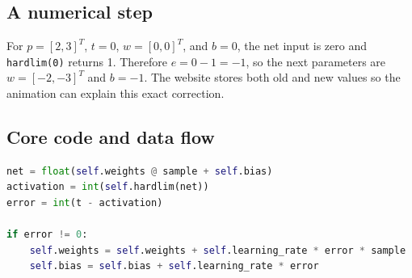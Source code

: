 \documentclass[12pt,a4paper,openany]{report}
\newcommand{\sourcepath}[1]{\texttt{#1}}
\begin{document}
\subsection{A numerical step}
For $p=[2,3]^T$, $t=0$, $w=[0,0]^T$, and $b=0$, the net input is zero and
\texttt{hardlim(0)} returns 1. Therefore $e=0-1=-1$, so the next parameters are
$w=[-2,-3]^T$ and $b=-1$. The website stores both old and new values so the
animation can explain this exact correction.

\subsection{Core code and data flow}
\begin{lstlisting}[language=Python,caption={One Perceptron update from \sourcepath{perceptron.py}.}]
net = float(self.weights @ sample + self.bias)
activation = int(self.hardlim(net))
error = int(t - activation)

if error != 0:
    self.weights = self.weights + self.learning_rate * error * sample
    self.bias = self.bias + self.learning_rate * error
\end{lstlisting}
\end{document}
